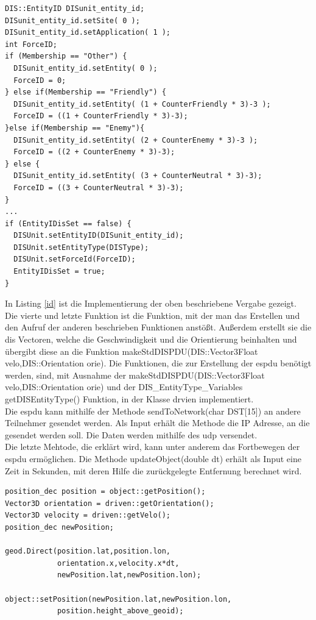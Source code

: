 \begin{lstlisting}[caption = EntityID und ForceID ,label= id]
DIS::EntityID DISunit_entity_id;
DISunit_entity_id.setSite( 0 );
DISunit_entity_id.setApplication( 1 );
int ForceID;
if (Membership == "Other") {
  DISunit_entity_id.setEntity( 0 );
  ForceID = 0;
} else if(Membership == "Friendly") {
  DISunit_entity_id.setEntity( (1 + CounterFriendly * 3)-3 );
  ForceID = ((1 + CounterFriendly * 3)-3);
}else if(Membership == "Enemy"){
  DISunit_entity_id.setEntity( (2 + CounterEnemy * 3)-3 );
  ForceID = ((2 + CounterEnemy * 3)-3);
} else {
  DISunit_entity_id.setEntity( (3 + CounterNeutral * 3)-3);
  ForceID = ((3 + CounterNeutral * 3)-3);
}
...
if (EntityIDisSet == false) {
  DISUnit.setEntityID(DISunit_entity_id);
  DISUnit.setEntityType(DISType);
  DISUnit.setForceId(ForceID);
  EntityIDisSet = true;
}
\end{lstlisting}
In Listing \ref{id} ist die Implementierung der oben beschriebene Vergabe gezeigt.
\\
Die vierte und letzte Funktion ist die Funktion, mit der man das Erstellen und den Aufruf der anderen beschrieben Funktionen anstößt. Außerdem erstellt sie die \ac{dis} Vectoren, welche die Geschwindigkeit und die Orientierung beinhalten und übergibt diese an die Funktion \glqq makeStdDISPDU(DIS::Vector3Float velo,DIS::Orientation orie)\grqq{}. 
Die Funktionen, die zur Erstellung der \ac{espdu} benötigt werden, sind, mit Ausnahme der \glqq makeStdDISPDU(DIS::Vector3Float velo,DIS::Orientation orie)\grqq{} und der \glqq DIS\_EntityType\_Variables getDISEntityType()\grqq{} Funktion, in der Klasse \glqq drvien \grqq{} implementiert. \\
Die \ac{espdu} kann mithilfe der Methode \glqq sendToNetwork(char DST[15]) \grqq{} an andere Teilnehmer gesendet werden. Als Input erhält die Methode die IP Adresse, an die gesendet werden soll. Die Daten werden mithilfe des \ac{udp} versendet.\\
Die letzte Mehtode, die erklärt wird, kann unter anderem das Fortbewegen der \ac{espdu} ermöglichen. 
Die Methode \glqq updateObject(double dt) \grqq{} erhält als Input eine Zeit in Sekunden, mit deren Hilfe die zurückgelegte Entfernung berechnet wird. 
 \begin{lstlisting}[caption = Update Funktion ,label= update]
position_dec position = object::getPosition();
Vector3D orientation = driven::getOrientation();
Vector3D velocity = driven::getVelo();
position_dec newPosition;

geod.Direct(position.lat,position.lon,
            orientation.x,velocity.x*dt,
            newPosition.lat,newPosition.lon);

object::setPosition(newPosition.lat,newPosition.lon,
		    position.height_above_geoid);
 \end{lstlisting}

